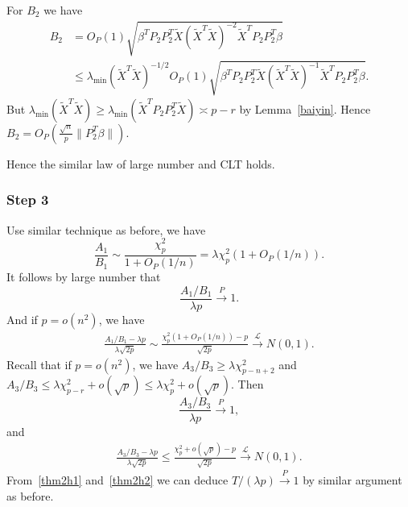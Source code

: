 \documentclass[review]{elsarticle}
\theoremstyle{plain}
\theoremstyle{definition}
\theoremstyle{remark}
\begin{document}
For $B_2$ we have
\begin{equation}
    \begin{aligned}
    B_2&=O_P(1)\sqrt{\beta^T P_2 P_2^T \tilde{X}{(\tilde{X}^T\tilde{X})}^{-2}\tilde{X}^T P_2 P_2^T \beta}\\
    &\leq \lambda_{\min}{(\tilde{X}^T\tilde{X})}^{-1/2}O_P(1)\sqrt{\beta^T P_2 P_2^T \tilde{X}{(\tilde{X}^T\tilde{X})}^{-1}\tilde{X}^T P_2 P_2^T \beta}.
    \end{aligned}
\end{equation}
But $\lambda_{\min}{(\tilde{X}^T\tilde{X})}\geq \lambda_{\min}{(\tilde{X}^T P_2 P_2^T \tilde{X})}\asymp p-r$ by Lemma~\ref{baiyin}.
Hence $B_2=O_P(\frac{\sqrt{n}}{p}\|P_2^T \beta\|)$.

Hence the similar law of large number and CLT holds.
\subsubsection{Step 3}

Use similar technique as before, we have
\begin{equation}
    \frac{A_1}{B_1}\sim \frac{\chi^2_p}{1+O_P(1/n)}= \lambda\chi^2_p (1+O_P(1/n)).
\end{equation}
It follows by large number that
\begin{equation}\label{thm2h1}
    \frac{A_1/B_1}{\lambda p}\xrightarrow{P} 1.
\end{equation}
And if  $p=o(n^2)$, we have
\begin{equation}\label{thm2c1}
    \begin{aligned}
        \frac{A_1/B_1-\lambda p}{\lambda\sqrt{2p}}\sim \frac{\chi^2_p (1+O_P(1/n))-p}{\sqrt{2p}}\xrightarrow{\mathcal{L}} N(0,1).
    \end{aligned}
\end{equation}
Recall that if $p=o(n^2)$, we have $A_3/B_3\geq \lambda \chi^2_{p-n+2}$ and
$A_3/B_3\leq \lambda \chi^2_{p-r}+o(\sqrt{p})\leq \lambda \chi^2_{p}+o(\sqrt{p})$. Then
\begin{equation}\label{thm2h2}
    \frac{A_3/B_3}{\lambda p}\xrightarrow{P} 1,
\end{equation}
and
\begin{equation}\label{thm2c2}
    \begin{aligned}
        \frac{A_3/B_3-\lambda p}{\lambda\sqrt{2p}}\leq \frac{\chi^2_p +o(\sqrt{p})-p}{\sqrt{2p}}\xrightarrow{\mathcal{L}} N(0,1).
    \end{aligned}
\end{equation}
From~\eqref{thm2h1} and~\eqref{thm2h2} we can deduce $T/(\lambda p)\xrightarrow{P}1$ by similar argument as before.
\end{document}
